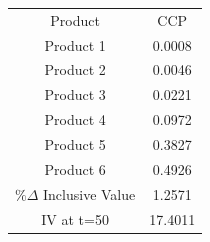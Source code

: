 \begin{tabular}{cc}
Product & CCP \\
Product 1 & 0.0008 \\
Product 2 & 0.0046 \\
Product 3 & 0.0221 \\
Product 4 & 0.0972 \\
Product 5 & 0.3827 \\
Product 6 & 0.4926 \\
$\%\Delta$ Inclusive Value & 1.2571 \\
IV at t=50 & 17.4011 \\
\end{tabular}